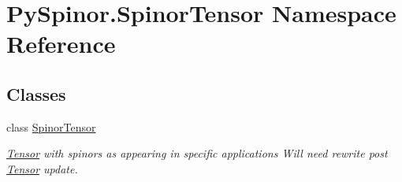 \hypertarget{namespace_py_spinor_1_1_spinor_tensor}{}\section{Py\+Spinor.\+Spinor\+Tensor Namespace Reference}
\label{namespace_py_spinor_1_1_spinor_tensor}
\subsection*{Classes}
\begin{DoxyCompactItemize}
\item 
class \hyperlink{class_py_spinor_1_1_spinor_tensor_1_1_spinor_tensor}{Spinor\+Tensor}
\begin{DoxyCompactList}\small\item\em \hyperlink{namespace_py_spinor_1_1_tensor}{Tensor} with spinors as appearing in specific applications Will need rewrite post \hyperlink{namespace_py_spinor_1_1_tensor}{Tensor} update. \end{DoxyCompactList}\end{DoxyCompactItemize}
